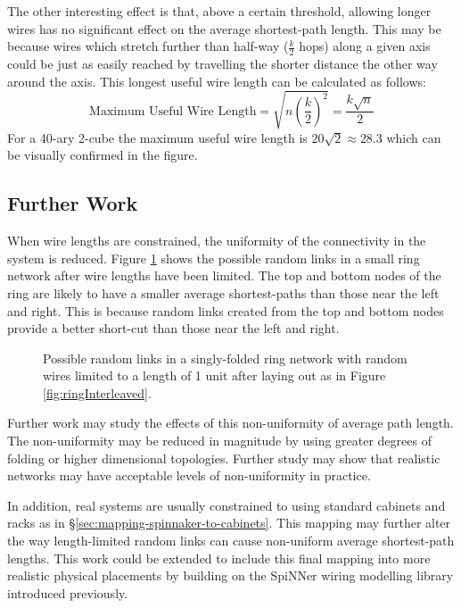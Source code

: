 			The other interesting effect is that, above a certain threshold, allowing
			longer wires has no significant effect on the average shortest-path
			length. This may be because wires which stretch further than half-way
			($\frac{k}{2}$ hops) along a given axis could be just as easily reached by
			travelling the shorter distance the other way around the axis. This
			longest useful wire length can be calculated as follows:
			\[
				\textrm{Maximum Useful Wire Length}
					= \sqrt{n \left({\frac{k}{2}}\right)^2}
					= \frac{k\sqrt{n}}{2}
			\]
			For a 40-ary 2-cube the maximum useful wire length is $20\sqrt{2} \approx
			28.3$ which can be visually confirmed in the figure.
		
		\subsection{Further Work}
			
			
			When wire lengths are constrained, the uniformity of the connectivity in
			the system is reduced. Figure \ref{fig:ringNetworkLimitedWires} shows the
			possible random links in a small ring network after wire lengths have been
			limited. The top and bottom nodes of the ring are likely to have a smaller
			average shortest-paths than those near the left and right. This is because
			random links created from the top and bottom nodes provide a better
			short-cut than those near the left and right.
			
			\begin{figure}
				\center
				
				\caption[Possible random links in a folded ring network with
				short wires.]{Possible random links in a singly-folded ring network with
				random wires limited to a length of 1 unit after laying out as in Figure
				\ref{fig:ringInterleaved}.}
				\label{fig:ringNetworkLimitedWires}
			\end{figure}
			
			Further work may study the effects of this non-uniformity of average path
			length. The non-uniformity may be reduced in magnitude by using greater
			degrees of folding or higher dimensional topologies. Further study may
			show that realistic networks may have acceptable levels of non-uniformity
			in practice.
			
			In addition, real systems are usually constrained to using standard
			cabinets and racks as in \S\ref{sec:mapping-spinnaker-to-cabinets}. This
			mapping may further alter the way length-limited random links can cause
			non-uniform average shortest-path lengths. This work could be extended to
			include this final mapping into more realistic physical placements by
			building on the SpiNNer wiring modelling library introduced previously.
	
